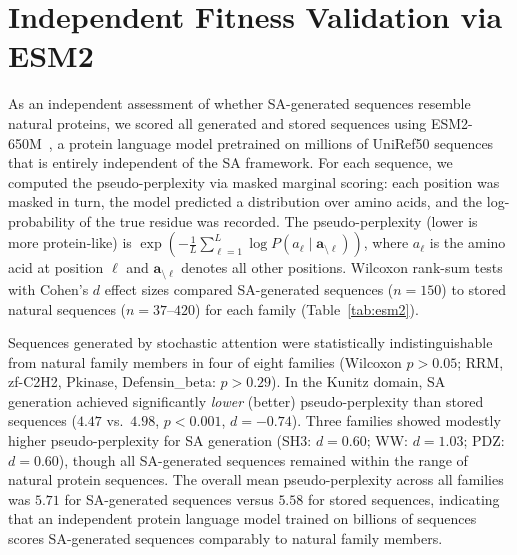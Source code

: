 \section{Independent Fitness Validation via ESM2}\label{si:esm2}

As an independent assessment of whether SA-generated sequences resemble natural proteins, we scored all generated and stored sequences using ESM2-650M~\cite{linEvolutionaryScaleModeling2023}, a protein language model pretrained on millions of UniRef50 sequences that is entirely independent of the SA framework. For each sequence, we computed the pseudo-perplexity via masked marginal scoring: each position was masked in turn, the model predicted a distribution over amino acids, and the log-probability of the true residue was recorded. The pseudo-perplexity (lower is more protein-like) is $\exp(-\frac{1}{L}\sum_{\ell=1}^{L} \log P(a_\ell \mid \mathbf{a}_{\setminus \ell}))$, where $a_\ell$ is the amino acid at position $\ell$ and $\mathbf{a}_{\setminus \ell}$ denotes all other positions. Wilcoxon rank-sum tests with Cohen's $d$ effect sizes compared SA-generated sequences ($n{=}150$) to stored natural sequences ($n{=}37$--$420$) for each family (Table~\ref{tab:esm2}).

Sequences generated by stochastic attention were statistically indistinguishable from natural family members in four of eight families (Wilcoxon $p > 0.05$; RRM, zf-C2H2, Pkinase, Defensin\_beta: $p > 0.29$). In the Kunitz domain, SA generation achieved significantly \emph{lower} (better) pseudo-perplexity than stored sequences ($4.47$ vs.\ $4.98$, $p < 0.001$, $d{=}{-}0.74$). Three families showed modestly higher pseudo-perplexity for SA generation (SH3: $d{=}0.60$; WW: $d{=}1.03$; PDZ: $d{=}0.60$), though all SA-generated sequences remained within the range of natural protein sequences. The overall mean pseudo-perplexity across all families was $5.71$ for SA-generated sequences versus $5.58$ for stored sequences, indicating that an independent protein language model trained on billions of sequences scores SA-generated sequences comparably to natural family members.

